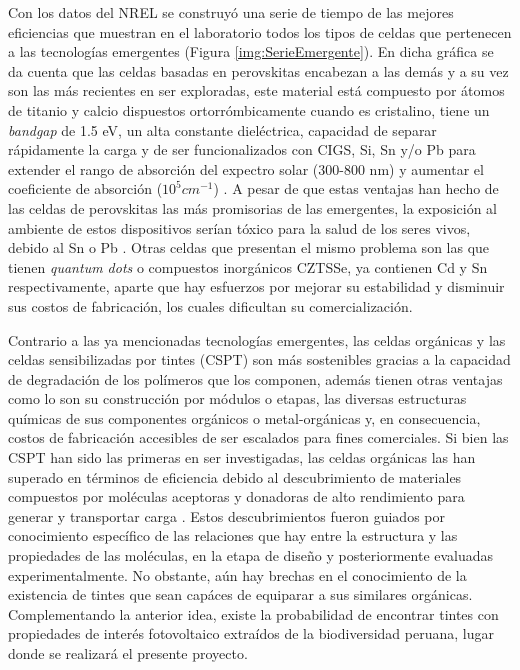 Con los datos del NREL se construyó una serie de tiempo de las mejores eficiencias que muestran en el laboratorio todos los tipos de celdas que pertenecen a las tecnologías emergentes  (Figura \ref{img:SerieEmergente}). En dicha gráfica se da cuenta que las celdas basadas en perovskitas encabezan a las demás y a su vez son las más recientes en ser exploradas, este material está compuesto por átomos de titanio y calcio dispuestos ortorrómbicamente cuando es cristalino, tiene un \textit{bandgap} de 1.5 eV, un alta constante dieléctrica, capacidad de separar rápidamente la carga y de ser funcionalizados con CIGS, Si, Sn y/o Pb para extender el rango de absorción del expectro solar (300-800 nm) y aumentar el coeficiente de absorción ($10^5cm^{-1}$) \cite{velilla2019outdoor}. A pesar de que estas ventajas han hecho de las celdas de perovskitas las más promisorias de las emergentes, la exposición al ambiente de estos dispositivos serían tóxico para la salud de los seres vivos, debido al Sn o Pb \cite{wang2022sustainable}. Otras celdas que presentan el mismo problema son las que tienen \textit{quantum dots}\cite{pan2014high} o compuestos inorgánicos CZTSSe\cite{suryawanshi2013czts}, ya contienen Cd y Sn respectivamente, aparte que hay esfuerzos por mejorar su estabilidad y disminuir sus costos de fabricación, los cuales dificultan su comercialización. 

Contrario a las ya mencionadas tecnologías emergentes, las celdas orgánicas y las celdas sensibilizadas por tintes (CSPT) son más sostenibles gracias a la capacidad de degradación de los polímeros que los componen, además tienen otras ventajas como lo son su construcción por módulos o etapas, las diversas estructuras químicas de sus componentes orgánicos o metal-orgánicas y, en consecuencia, costos de fabricación accesibles de ser escalados para fines comerciales. Si bien las CSPT han sido las primeras en ser investigadas, las celdas orgánicas las han superado en términos de eficiencia debido al descubrimiento de materiales compuestos por moléculas aceptoras y donadoras de alto rendimiento para generar y transportar carga \cite{li2022recent}. Estos descubrimientos fueron guiados por conocimiento específico de las relaciones que hay entre la estructura y las propiedades de las moléculas, en la etapa de diseño y posteriormente evaluadas experimentalmente. No obstante, aún hay brechas en el conocimiento de la existencia de tintes que sean capáces de equiparar a sus similares orgánicas. Complementando la anterior idea, existe la probabilidad de encontrar tintes con propiedades de interés fotovoltaico extraídos de la biodiversidad peruana, lugar donde se realizará el presente proyecto.

